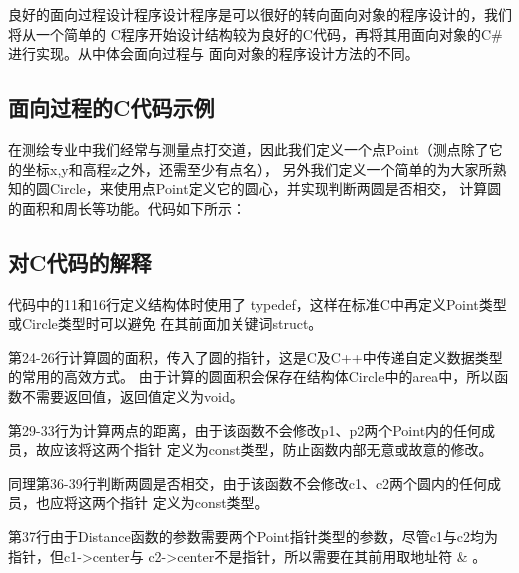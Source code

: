 良好的面向过程设计程序设计程序是可以很好的转向面向对象的程序设计的，我们将从一个简单的
C程序开始设计结构较为良好的C代码，再将其用面向对象的C\#进行实现。从中体会面向过程与
面向对象的程序设计方法的不同。
 
 \subsection{面向过程的C代码示例}
 
在测绘专业中我们经常与测量点打交道，因此我们定义一个点Point（测点除了它的坐标x,y和高程z之外，还需至少有点名），
 另外我们定义一个简单的为大家所熟知的圆Circle，来使用点Point定义它的圆心，并实现判断两圆是否相交，
 计算圆的面积和周长等功能。代码如下所示：





% 
% 
% 

\subsection{对C代码的解释}
代码中的11和16行定义结构体时使用了 typedef，这样在标准C中再定义Point类型或Circle类型时可以避免
在其前面加关键词struct。

第24-26行计算圆的面积，传入了圆的指针，这是C及C++中传递自定义数据类型的常用的高效方式。
由于计算的圆面积会保存在结构体Circle中的area中，所以函数不需要返回值，返回值定义为void。

第29-33行为计算两点的距离，由于该函数不会修改p1、p2两个Point内的任何成员，故应该将这两个指针
定义为const类型，防止函数内部无意或故意的修改。

同理第36-39行判断两圆是否相交，由于该函数不会修改c1、c2两个圆内的任何成员，也应将这两个指针
定义为const类型。

第37行由于Distance函数的参数需要两个Point指针类型的参数，尽管c1与c2均为指针，但c1->center与
c2->center不是指针，所以需要在其前用取地址符 \& 。


